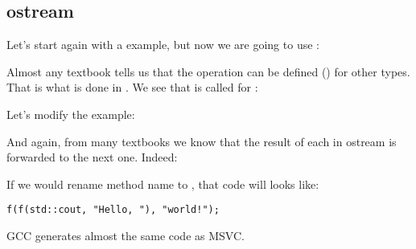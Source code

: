 \subsection{ostream}

Let's start again with a  example, but now we are going to use :



Almost any \Cpp textbook tells us that the \TT{<<} operation can be defined ()
for other types.
That is what is done in .
We see that  is called for :



Let's modify the example:



And again, from many \Cpp textbooks we know that the result of each  in ostream is forwarded to the
next one.
Indeed:



If we would rename  method name to \ttf{}, that code will looks like:

\begin{lstlisting}[style=customc]
f(f(std::cout, "Hello, "), "world!");
\end{lstlisting}

GCC generates almost the same code as MSVC.

